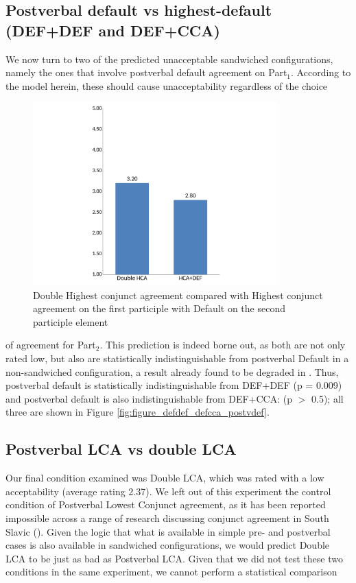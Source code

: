 \documentclass[output=paper
,modfonts
,nonflat]{langsci/langscibook}
\begin{document}
\subsection{Postverbal default vs highest-default (DEF+DEF and DEF+CCA)} \label{sec:postverbaldef}
We now turn to two of the predicted unacceptable sandwiched configurations, namely the ones that involve postverbal default agreement on Part$_1$. According to the model herein, these should cause unacceptability regardless of the choice

\begin{figure}[h]
	\begin{center}
		\includegraphics[height=200pt]{figures/hca_hcadef_nl.pdf}
	\end{center}
	\caption{Double Highest conjunct agreement compared with Highest conjunct agreement on the first participle with Default on the second participle element}
	\label{fig:figure_hca_hcadef}
\end{figure}
\noindent of agreement for Part$_2$. This prediction is indeed borne out, as both are not only rated low, but also are statistically indistinguishable from postverbal Default in a non-sandwiched configuration, a result already found to be degraded in \citet{willergold:16}. Thus, postverbal default is statistically indistinguishable from DEF+DEF (p = 0.009) and postverbal default is also indistinguishable from DEF+CCA: (p $>$ 0.5); all three are shown in Figure \ref{fig:figure_defdef_defcca_postvdef}.


\subsection{Postverbal LCA vs double LCA}
Our final condition examined was Double LCA, which was rated with a low acceptability (average rating 2.37). We left out of this experiment the control condition of Postverbal Lowest Conjunct agreement, as it has been reported impossible across a range of research discussing conjunct agreement in South Slavic (\citealt{marusicnevinsbadecker:15,boskovic:09,puskarmurphy:17,willergold:16}). Given the logic that what is available in simple pre- and postverbal cases is also available in sandwiched configurations, we would predict Double LCA to be just as bad as Postverbal LCA. Given that we did not test these two conditions in the same experiment, we cannot perform a statistical comparison 
\end{document}
